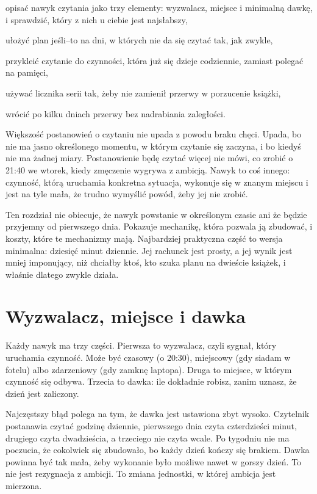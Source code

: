 
\begin{cele}
  \item opisać nawyk czytania jako trzy elementy: wyzwalacz, miejsce i minimalną dawkę, i sprawdzić, który z nich u ciebie jest najsłabszy,
  \item ułożyć plan \glqq jeśli--to\grqq{} na dni, w których nie da się czytać tak, jak zwykle,
  \item przykleić czytanie do czynności, która już się dzieje codziennie, zamiast polegać na pamięci,
  \item używać licznika serii tak, żeby nie zamienił przerwy w porzucenie książki,
  \item wrócić po kilku dniach przerwy bez nadrabiania zaległości.
\end{cele}

Większość postanowień o czytaniu nie upada z powodu braku chęci. Upada, bo nie ma jasno określonego momentu, w którym czytanie się zaczyna, i bo \glqq kiedyś\grqq{} nie ma żadnej miary. Postanowienie \glqq będę czytać więcej\grqq{} nie mówi, co zrobić o 21:40 we wtorek, kiedy zmęczenie wygrywa z ambicją. Nawyk to coś innego: czynność, którą uruchamia konkretna sytuacja, wykonuje się w znanym miejscu i jest na tyle mała, że trudno wymyślić powód, żeby jej nie zrobić.

Ten rozdział nie obiecuje, że nawyk powstanie w określonym czasie ani że będzie przyjemny od pierwszego dnia. Pokazuje mechanikę, która pozwala ją zbudować, i koszty, które te mechanizmy mają. Najbardziej praktyczna część to wersja minimalna: dziesięć minut dziennie. Jej rachunek jest prosty, a jej wynik jest mniej imponujący, niż chciałby ktoś, kto szuka planu na dwieście książek, i właśnie dlatego zwykle działa.

\section{Wyzwalacz, miejsce i dawka}

Każdy nawyk ma trzy części. Pierwsza to wyzwalacz, czyli sygnał, który uruchamia czynność. Może być czasowy (\glqq o 20:30\grqq{}), miejscowy (\glqq gdy siadam w fotelu\grqq{}) albo zdarzeniowy (\glqq gdy zamknę laptopa\grqq{}). Druga to miejsce, w którym czynność się odbywa. Trzecia to dawka: ile dokładnie robisz, zanim uznasz, że dzień jest zaliczony.

Najczęstszy błąd polega na tym, że dawka jest ustawiona zbyt wysoko. Czytelnik postanawia czytać godzinę dziennie, pierwszego dnia czyta czterdzieści minut, drugiego czyta dwadzieścia, a trzeciego nie czyta wcale. Po tygodniu nie ma poczucia, że cokolwiek się zbudowało, bo każdy dzień kończy się brakiem. Dawka powinna być tak mała, żeby wykonanie było możliwe nawet w gorszy dzień. To nie jest rezygnacja z ambicji. To zmiana jednostki, w której ambicja jest mierzona.

